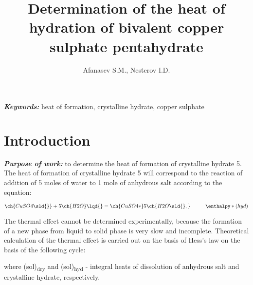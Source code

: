 \documentclass[12pt, letterpaper]{article}
\title{Determination of the heat of hydration of bivalent copper sulphate pentahydrate}
\author{Afanasev S.M., Nesterov I.D.}
\date{}
\providecommand{\keywords} {
    \small	
    \textbf{\textit{Keywords:}}
}
\begin{document}
    \maketitle
    \keywords{
        heat of formation,
        crystalline hydrate,
        copper sulphate}
    \tableofcontents
    \newpage

    \section{Introduction}
        \textbf{\textit{Purpose of work:}} to determine the heat of formation of crystalline hydrate 5. \\ 
        
        The heat of formation of crystalline hydrate 5 will correspond to
        the reaction of addition of 5 moles of water to 1 mole of anhydrous salt according to the equation:

        \begin{equation}
            \ch{CuSO4\sld{}} + 5 {\ch{H2O}\lqd{}} = \ch{CuSO4*}5\ch{H2O\sld{},} \hspace{10 mm} \enthalpy*(hyd){}
        \end{equation}

        The thermal effect cannot be determined experimentally,
        because the formation of a new phase from liquid to solid phase is very slow and incomplete.
        Theoretical calculation of the thermal effect is carried out on the basis of Hess's law
        on the basis of the following cycle: 
        \begin{center}
        \end{center}
        
        where \enthalpy*(sol){}\textsubscript{dry} and \enthalpy*(sol){}\textsubscript{hyd} - integral heats of dissolution
        of anhydrous salt and crystalline hydrate, respectively. \\
\end{document}

